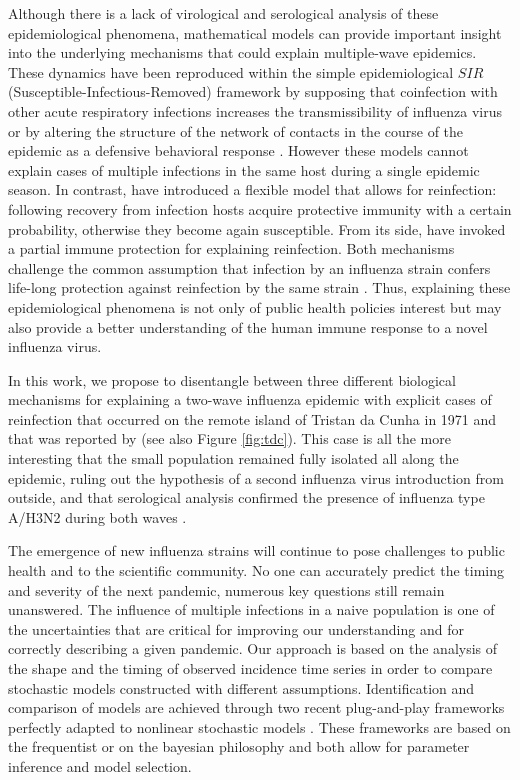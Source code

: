 Although there is a lack of virological and serological analysis of
these epidemiological phenomena, mathematical models can provide
important insight into the underlying mechanisms that could explain
multiple-wave epidemics. These dynamics have been reproduced within
the simple epidemiological $SIR$ (Susceptible-Infectious-Removed)
framework by supposing that coinfection with other acute respiratory
infections increases the transmissibility of influenza virus
\citep{Merler2008} or by altering the structure of the network of
contacts in the course of the epidemic as a defensive behavioral
response \citep{Poletti2009}. However these models cannot explain
cases of multiple infections in the same host during a single epidemic
season. In contrast, \citet{Mathews2007} have introduced a flexible
model that allows for reinfection: following recovery from infection
hosts acquire protective immunity with a certain probability,
otherwise they become again susceptible. From its side,
\citet{Gomes2004} have invoked a partial immune protection for
explaining reinfection. Both mechanisms challenge the common
assumption that infection by an influenza strain confers life-long
protection against reinfection by the same strain \citep{Earn2002}.
Thus, explaining these epidemiological phenomena is not only of public
health policies interest but may also provide a better understanding
of the human immune response to a novel influenza virus.

In this work, we propose to disentangle between three different
biological mechanisms for explaining a two-wave influenza epidemic
with explicit cases of reinfection that occurred on the remote island
of Tristan da Cunha in 1971 and that was reported by
\citet{Mantle1973} (see also Figure \ref{fig:tdc}). This case is all
the more interesting that the small population remained fully isolated
all along the epidemic, ruling out the hypothesis of a second
influenza virus introduction from outside, and that serological
analysis confirmed the presence of influenza type A/H3N2 during both
waves \citep{Mantle1973}.

The emergence of new influenza strains will continue to pose
challenges to public health and to the scientific community. No one
can accurately predict the timing and severity of the next pandemic,
numerous key questions still remain unanswered. The influence of
multiple infections in a naive population is one of the uncertainties
that are critical for improving our understanding and for correctly
describing a given pandemic. Our approach is based on the analysis of
the shape and the timing of observed incidence time series in order to
compare stochastic models constructed with different
assumptions. Identification and comparison of models are achieved
through two recent plug-and-play frameworks perfectly adapted to
nonlinear stochastic models \citep{Ionides2006,Toni2009}. These
frameworks are based on the frequentist \citep{Ionides2006} or on the
bayesian \citep{Toni2009} philosophy and both allow for parameter
inference and model selection.

